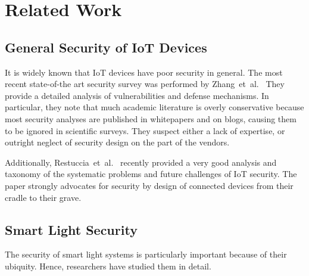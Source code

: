 \section{Related Work}
\label{sec:related_work}


\subsection{General Security of IoT Devices}%
\label{sub:general_security_iot}


It is widely known that IoT devices have poor security in general.
The most recent state-of-the art security survey was performed by
Zhang~et~al.~\cite{Zhang:2017:UISTDCBWWNaWWG} %
They provide a detailed analysis of vulnerabilities and defense mechanisms.
In particular, they note that much academic literature is overly conservative because most security analyses are published in whitepapers and on blogs, causing them to be ignored in scientific surveys.
They suspect either a lack of expertise, or outright neglect of security design on the part of the vendors.

Additionally,
Restuccia~et~al.~\cite{Restuccia:2018:SITNPaRC} %
recently provided a very good analysis and taxonomy of the systematic problems and future challenges of IoT security. The paper strongly advocates for security by design of connected devices from their cradle to their grave.

\subsection{Smart Light Security}%
\label{sub:smart_light_security}
The security of smart light systems is particularly important because of their ubiquity. Hence, researchers have studied them in detail.

